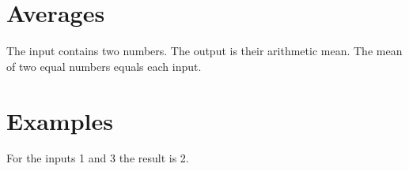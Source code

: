 \documentclass{article}
\begin{document}
\section{Averages}\label{sec:mean}
The input contains two numbers. The output is their arithmetic mean.
\newpage
The mean of two equal numbers equals each input.
\section{Examples}
For the inputs 1 and 3 the result is 2.
\end{document}
